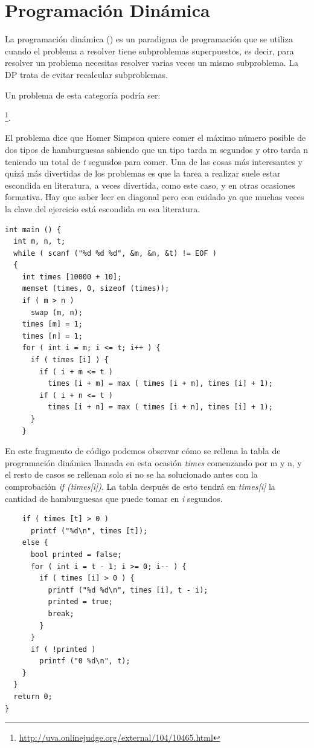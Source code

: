 \section{Programación Dinámica}
\label{sec:dp}

La programación dinámica () es un paradigma de programación
que se utiliza cuando el problema a resolver tiene subproblemas
superpuestos, es decir, para resolver un problema necesitas resolver
varias veces un mismo subproblema. La DP trata de evitar recalcular
subproblemas. 

Un problema de esta categoría podría ser:

\footnote{\url{http://uva.onlinejudge.org/external/104/10465.html}}.

El problema dice que Homer Simpson quiere comer el máximo número
posible de dos tipos de hamburguesas sabiendo que un tipo tarda m
segundos y otro tarda n teniendo un total de \emph{t} segundos para
comer. Una de las cosas más interesantes y quizá más divertidas de los
problemas es que la tarea a realizar suele estar escondida en
literatura, a veces divertida, como este caso, y en otras ocasiones
formativa. Hay que saber leer en diagonal pero con cuidado ya que
muchas veces la clave del ejercicio está escondida en esa literatura.

\begin{lstlisting}
int main () {
  int m, n, t;
  while ( scanf ("%d %d %d", &m, &n, &t) != EOF ) 
  {
    int times [10000 + 10];
    memset (times, 0, sizeof (times));
    if ( m > n ) 
      swap (m, n);
    times [m] = 1;
    times [n] = 1;
    for ( int i = m; i <= t; i++ ) {
      if ( times [i] ) {
        if ( i + m <= t ) 
          times [i + m] = max ( times [i + m], times [i] + 1);
        if ( i + n <= t ) 
          times [i + n] = max ( times [i + n], times [i] + 1);
      }
    }
\end{lstlisting}

En este fragmento de código podemos observar cómo se rellena la tabla
de programación dinámica llamada en esta ocasión \emph{times} comenzando
por m y n, y el resto de casos se rellenan solo si no se ha
solucionado antes con la comprobación \emph{if (times[i])}. La tabla
después de esto tendrá en \emph{times[i]} la cantidad de hamburguesas que
puede tomar en \emph{i} segundos.


\begin{lstlisting}
    if ( times [t] > 0 )
      printf ("%d\n", times [t]);
    else {
      bool printed = false;
      for ( int i = t - 1; i >= 0; i-- ) {
        if ( times [i] > 0 ) {
          printf ("%d %d\n", times [i], t - i);
          printed = true;
          break;
        }
      }
      if ( !printed )
        printf ("0 %d\n", t);
    }
  }
  return 0;
}
\end{lstlisting}

